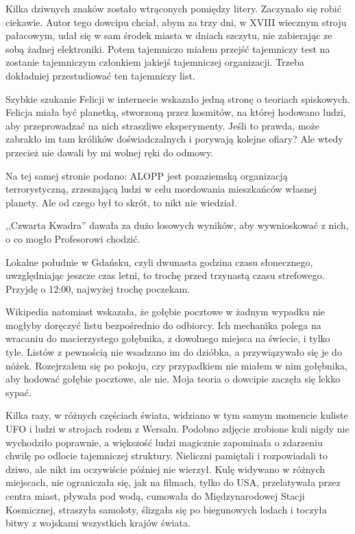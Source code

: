 Kilka dziwnych znaków zostało wtrąconych pomiędzy litery. Zaczynało się robić ciekawie. Autor tego dowcipu chciał, abym za trzy dni, w XVIII wiecznym stroju pałacowym,
udał się w sam środek miasta w dniach szczytu, nie zabierając ze sobą żadnej elektroniki.
Potem tajemniczo miałem przejść tajemniczy test na zostanie tajemniczym członkiem jakiejś tajemniczej organizacji.
Trzeba dokładniej przestudiować ten tajemniczy list.

Szybkie szukanie Felicji w internecie wskazało jedną stronę o teoriach spiskowych.
Felicja miała być planetką, stworzoną przez kosmitów, na której hodowano ludzi, aby przeprowadzać na nich straszliwe eksperymenty.
Jeśli to prawda, może zabrakło im tam królików doświadczalnych i porywają kolejne ofiary?
Ale wtedy przecież nie dawali by mi wolnej ręki do odmowy.

Na tej samej stronie podano: ALOPP jest pozaziemską organizacją terrorystyczną, zrzeszającą ludzi w celu mordowania mieszkańców własnej planety.
Ale od czego był to skrót, to nikt nie wiedział.

,,Czwarta Kwadra'' dawała za dużo losowych wyników, aby wywnioskować z nich, o co mogło Profesorowi chodzić.

Lokalne południe w Gdańsku, czyli dwunasta godzina czasu słonecznego, uwzględniając jeszcze czas letni, to trochę przed trzynastą czasu strefowego.
Przyjdę o 12:00, najwyżej trochę poczekam.

Wikipedia natomiast wskazała, że gołębie pocztowe w żadnym wypadku nie mogłyby doręczyć listu bezpośrednio do odbiorcy.
Ich mechanika polega na wracaniu do macierzystego gołębnika, z dowolnego miejsca na świecie, i tylko tyle.
Listów z pewnością nie wsadzano im do dzióbka, a przywiązywało się je do nóżek.
Rozejrzałem się po pokoju, czy przypadkiem nie miałem w nim gołębnika, aby hodować gołębie pocztowe, ale nie.
Moja teoria o dowcipie zaczęła się lekko sypać.

Kilka razy, w różnych częściach świata, widziano w tym samym momencie kuliste UFO i ludzi w strojach rodem z Wersalu.
Podobno zdjęcie zrobione kuli nigdy nie wychodziło poprawnie, a większość ludzi magicznie zapominała o zdarzeniu chwilę po odlocie tajemniczej struktury.
Nieliczni pamiętali i rozpowiadali to dziwo, ale nikt im oczywiście później nie wierzył.
Kulę widywano w różnych miejscach, nie ograniczała się, jak na filmach, tylko do USA, przelatywała przez centra miast, pływała pod wodą, cumowała do Międzynarodowej Stacji Kosmicznej, straszyła samoloty, ślizgała się po biegunowych lodach i toczyła bitwy z wojskami wszystkich krajów świata.

